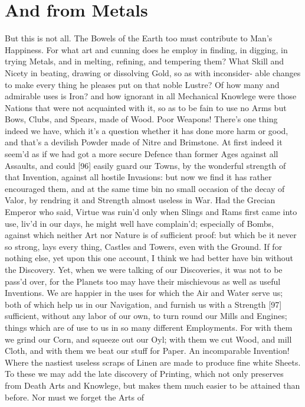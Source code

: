 \documentclass[letterpaper]{book}
\begin{document}
\section{And from Metals}

But this is not all. The Bowels of the Earth too must contribute to Man's
Happiness. For what art and cunning does he employ in finding, in digging,
in trying Metals, and in melting, refining, and tempering them? What Skill
and Nicety in beating, drawing or dissolving Gold, so as with inconsider-
able changes to make every thing he pleases put on that noble Lustre? Of how
many and admirable uses is Iron? and how ignorant in all Mechanical
Knowlege were those Nations that were not acquainted with it, so as to be
fain to use no Arms but Bows, Clubs, and Spears, made of Wood.  Poor
Weapons! There's one thing indeed we have, which it's a question whether it
has done more harm or good, and that's a devilish Powder made of Nitre and
Brimstone. At first indeed it seem'd as if we had got a more secure Defence
than former Ages against all Assaults, and could [96] easily guard our
Towns, by the wonderful strength of that Invention, against all hostile
Invasions: but now we find it has rather encouraged them, and at the same
time bin no small occasion of the decay of Valor, by rendring it and
Strength almost useless in War. Had the Grecian Emperor who said, Virtue was
ruin'd only when Slings and Rams first came into use, liv'd in our days, he
might well have complain'd; especially of Bombs, against which neither Art
nor Nature is of sufficient proof: but which be it never so strong, lays
every thing, Castles and Towers, even with the Ground. If for nothing else,
yet upon this one account, I think we had better have bin without the
Discovery. Yet, when we were talking of our Discoveries, it was not to be
pass'd over, for the Planets too may have their mischievous as well as
useful Inventions.  We are happier in the uses for which the Air and Water
serve us; both of which help us in our Navigation, and furnish us with a
Strength [97] sufficient, without any labor of our own, to turn round our
Mills and Engines; things which are of use to us in so many different
Employments. For with them we grind our Corn, and squeeze out our Oyl; with
them we cut Wood, and mill Cloth, and with them we beat our stuff for Paper.
An incomparable Invention! Where the nastiest useless scraps of Linen are
made to produce fine white Sheets. To these we may add the late discovery of
Printing, which not only preserves from Death Arts and Knowlege, but makes
them much easier to be attained than before. Nor must we forget the Arts of
\end{document}

